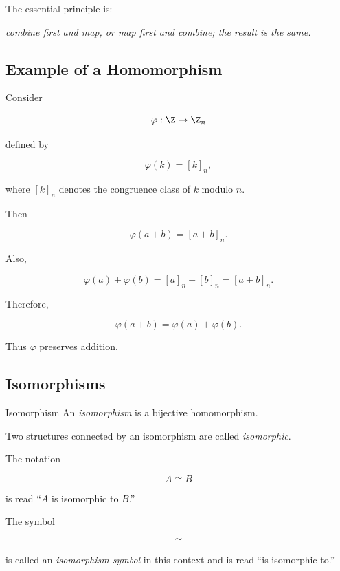 The essential principle is:

\begin{center}
\emph{combine first and map, or map first and combine; the result is the same.}
\end{center}

\subsection{Example of a Homomorphism}
\label{subsec:homomorphism-example}

Consider

\[ \varphi:\Z\to\Z_n \]

defined by

\[ \varphi(k)=[k]_n, \]

where \([k]_n\) denotes the congruence class of \(k\) modulo \(n\).

Then

\[ \varphi(a+b)=[a+b]_n. \]

Also,

\[ \varphi(a)+\varphi(b)=[a]_n+[b]_n=[a+b]_n. \]

Therefore,

\[ \varphi(a+b)=\varphi(a)+\varphi(b). \]

Thus \(\varphi\) preserves addition.

\subsection{Isomorphisms}
\label{subsec:isomorphisms}

\begin{definitionbox}{Isomorphism}
An \emph{isomorphism} is a bijective homomorphism.
\end{definitionbox}

Two structures connected by an isomorphism are called \emph{isomorphic}.

The notation

\[ A\cong B \]

is read ``\(A\) is isomorphic to \(B\).''

The symbol

\[ \cong \]

is called an \emph{isomorphism symbol} in this context and is read ``is
isomorphic to.''

